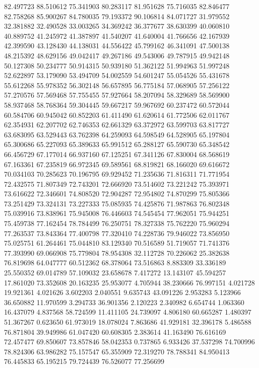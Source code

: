 82.497723
88.510612
75.341903
80.283117
81.951628
75.716035
82.846477
82.758268
85.900267
84.780035
79.193372
90.106814
84.071727
31.979552
32.381882
32.490528
33.003265
34.369242
36.377677
38.630399
40.060810
40.889752
41.245972
41.387897
41.540207
41.640004
41.766656
42.167939
42.399590
43.128430
44.138031
44.556422
45.799162
46.341091
47.500138
48.215392
48.629156
49.042417
49.267186
49.543006
49.787915
49.942148
50.127308
50.234777
50.914315
50.939180
51.362122
51.994963
51.997248
52.622897
53.179090
53.494709
54.002559
54.601247
55.054526
55.431678
55.612268
55.978352
56.302148
56.657895
56.775184
57.068905
57.256122
57.270576
57.569468
57.755455
57.927664
58.207094
58.329689
58.569900
58.937468
58.768364
59.304445
59.667217
59.967692
60.237472
60.572044
60.584706
60.945042
60.852203
61.411490
61.620614
61.772506
62.011767
62.354931
62.207702
62.746353
62.661329
63.372972
63.599703
63.817727
63.683095
63.529443
63.762398
64.259093
64.598549
64.528905
65.197804
65.300686
65.227093
65.389633
65.991512
65.288127
65.590730
65.348542
66.456729
67.177014
66.937160
67.125251
67.341126
67.830004
68.568619
67.163361
67.235819
66.972345
69.589561
68.819821
68.166020
69.616672
70.034103
70.285623
70.196795
69.929452
71.235636
71.816311
71.771954
72.432575
71.807349
72.743201
72.666920
73.514602
73.221242
75.393971
73.616622
72.346601
74.808520
72.904287
72.954802
74.870299
75.805366
73.251429
73.324131
73.227333
75.085935
74.425876
71.987863
76.802348
75.039916
73.838961
75.945008
76.446603
74.545454
77.962051
75.944251
75.459738
77.162454
78.784499
76.250751
78.327338
75.762220
75.960294
77.263537
73.843364
77.400798
77.320410
74.228736
79.946022
73.856950
75.025751
61.264461
75.044810
83.129340
70.516589
51.719057
71.741376
77.393990
69.066908
75.779804
78.954308
32.112728
70.226062
25.382638
76.819698
64.047777
60.512362
68.378064
73.516863
8.883309
33.336189
25.550352
69.014789
57.109032
23.658678
7.417272
13.143107
45.594257
17.861020
73.352608
20.163235
25.953077
4.705944
38.230666
76.997151
4.021728
19.921361
4.021626
3.602203
2.040551
9.635743
43.091226
2.953283
5.123966
36.650882
11.970599
3.294733
36.901356
2.120223
2.340982
6.654744
1.063360
16.437079
4.837568
58.724599
11.411105
24.739097
4.806180
60.665287
1.480397
51.367267
0.623650
61.973019
18.078024
7.863686
41.929181
32.396178
5.486588
76.871804
39.949986
61.047420
60.608305
2.383614
41.163490
76.616169
72.457477
69.850607
73.857846
58.042353
0.737865
6.933426
37.537298
74.700996
78.824306
63.986282
75.157547
65.355909
72.319270
78.788341
84.950413
76.445833
65.195215
79.724439
76.526077
77.256699
